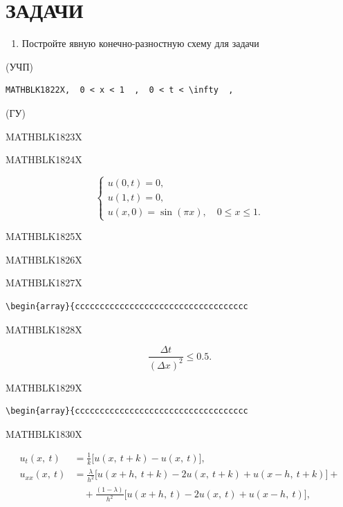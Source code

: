 \documentclass[
  ukrainian,
]{article}
\providecommand{\tightlist}{%
  \setlength{\itemsep}{0pt}\setlength{\parskip}{0pt}}
\begin{document}
\section{ЗАДАЧИ}\label{ux437ux430ux434ux430ux447ux438-11}

\begin{enumerate}
\def\labelenumi{\arabic{enumi}.}
\tightlist
\item
  Постройте явную конечно-разностную схему для задачи
\end{enumerate}

(УЧП)

\begin{verbatim}
MATHBLK1822X,  0 < x < 1  ,  0 < t < \infty  ,
\end{verbatim}

(ГУ)

MATHBLK1823X

MATHBLK1824X

\[
\begin{cases} u(0, t) = 0, \\ u(1, t) = 0, \\ u(x, 0) = \sin(\pi x), \quad 0 \le x \le 1. \end{cases}
\]

MATHBLK1825X

MATHBLK1826X

MATHBLK1827X

\begin{verbatim}
\begin{array}{ccccccccccccccccccccccccccccccccccc
\end{verbatim}

MATHBLK1828X

\[
\frac{\Delta t}{(\Delta x)^2} \leqslant 0.5.
\]

MATHBLK1829X

\begin{verbatim}
\begin{array}{ccccccccccccccccccccccccccccccccccc
\end{verbatim}

MATHBLK1830X

\[
\begin{split} u_t(x,\ t) &= \frac{1}{k} \big[ u(x,\ t+k) - u(x,\ t) \big], \\ u_{xx}(x,\ t) &= \frac{\lambda}{h^2} \big[ u(x+h,\ t+k) - 2u(x,\ t+k) + u(x-h,\ t+k) \big] + \\ &\quad + \frac{(1-\lambda)}{h^2} \big[ u(x+h,\ t) - 2u(x,\ t) + u(x-h,\ t) \big], \end{split}
\]
\end{document}

